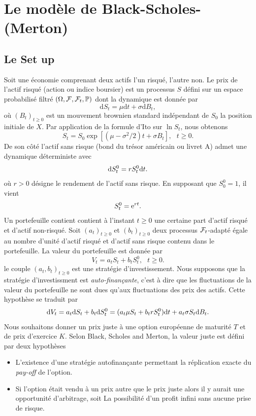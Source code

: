 \section{Le modèle de Black-Scholes-(Merton)}\label{sec:BS}
\subsection{Le Set up}
Soit une économie comprenant deux actifs l'un risqué, l'autre non. Le prix de l'actif risqué (action ou indice boursier) est un processus $S$ défini sur un espace probabilisé filtré $(\Omega,\mathcal{F}, \mathcal{F}_t, \mathbb{P})$ dont la dynamique est donnée 
par 
$$
\text{d}S_t = \mu \text{d}t + \sigma \text{d}B_t,
$$ 
où $(B_t)_{t\geq 0}$ est un mouvement brownien standard indépendant de $S_0$ la position initiale de $X$. Par application de la formule d'Ito sur $\ln S_t$, nous obtenons 
$$
S_t = S_0\exp[(\mu - \sigma^2/2)t + \sigma B_t],\text{ }t\geq 0.
$$
De son côté l'actif sans risque (bond du trésor américain ou livret A) admet une dynamique déterministe avec 
$$
\text{d} S_t^0 = r S_t^0 \text{d} t.
$$
où $r>0$ désigne le rendement de l'actif sans risque. En supposant que $S^0_0 = 1$, il vient 
$$
S_t^0 = \mathrm{e}^{r t}. 
$$
Un portefeuille contient contient à l'instant $t\geq 0$ une certaine part d'actif risqué et d'actif non-risqué. Soit $(a_t)_{t\geq 0}$ et $(b_t)_{t\geq 0}$ deux processus $\mathcal{F}_t$-adapté égale au nombre d'unité d'actif risqué et d'actif sans risque contenu dans le portefeuille. La valeur du portefeuille est donnée par 
$$
V_t = a_t S_t + b_t S^0_t,\text{ }t\geq 0.
$$
le couple $(a_t, b_t)_{t\geq 0}$ est une stratégie d'investissement. Nous supposons que la stratégie d'investissment est \textit{auto-finançante}, c'est à dire que les fluctuations de la valeur du portefeuille ne sont dues qu'aux fluctuations des prix des actifs. Cette hypothèse se traduit par 
$$
\text{d} V_t = a_t \text{d} S_t + b_t \text{d} S^0_t = (a_t\mu S_t + b_tr S_t^0)\text{d} t  + a_t \sigma S_t \text{d} B_t.
$$
Nous souhaitons donner un prix juste à une option européenne de maturité $T$ et de prix d'exercice $K$. Selon Black, Scholes and Merton, la valeur juste est défini par deux hypothèses
\begin{itemize}
    \item L'existence d'une stratégie autofinançante permettant la réplication exacte du \textit{pay-off} de l'option. 
    \item Si l'option était vendu à un prix autre que le prix juste alors il y aurait une opportunité d'arbitrage, soit La possibilité d'un profit infini sans aucune prise de risque.
\end{itemize}
